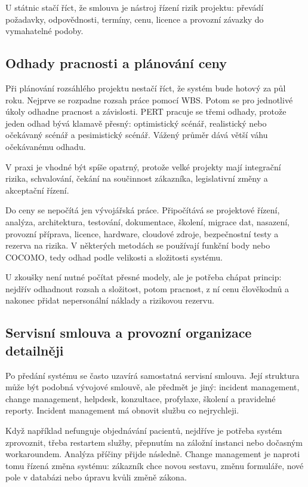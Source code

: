 U státnic stačí říct, že smlouva je nástroj řízení rizik projektu: převádí požadavky, odpovědnosti, termíny, cenu, licence a provozní závazky do vymahatelné podoby.

\subsection*{Odhady pracnosti a plánování ceny}

Při plánování rozsáhlého projektu nestačí říct, že systém bude hotový za půl roku. Nejprve se rozpadne rozsah práce pomocí WBS. Potom se pro jednotlivé úkoly odhadne pracnost a závislosti. PERT pracuje se třemi odhady, protože jeden odhad bývá klamavě přesný: optimistický scénář, realistický nebo očekávaný scénář a pesimistický scénář. Vážený průměr dává větší váhu očekávanému odhadu.

V praxi je vhodné být spíše opatrný, protože velké projekty mají integrační rizika, schvalování, čekání na součinnost zákazníka, legislativní změny a akceptační řízení.

Do ceny se nepočítá jen vývojářská práce. Připočítává se projektové řízení, analýza, architektura, testování, dokumentace, školení, migrace dat, nasazení, provozní příprava, licence, hardware, cloudové zdroje, bezpečnostní testy a rezerva na rizika. V některých metodách se používají funkční body nebo COCOMO, tedy odhad podle velikosti a složitosti systému.

U zkoušky není nutné počítat přesné modely, ale je potřeba chápat princip: nejdřív odhadnout rozsah a složitost, potom pracnost, z ní cenu člověkodnů a nakonec přidat nepersonální náklady a rizikovou rezervu.

\subsection*{Servisní smlouva a provozní organizace detailněji}

Po předání systému se často uzavírá samostatná servisní smlouva. Její struktura může být podobná vývojové smlouvě, ale předmět je jiný: incident management, change management, helpdesk, konzultace, profylaxe, školení a pravidelné reporty. Incident management má obnovit službu co nejrychleji.

Když například nefunguje objednávání pacientů, nejdříve je potřeba systém zprovoznit, třeba restartem služby, přepnutím na záložní instanci nebo dočasným workaroundem. Analýza příčiny přijde následně. Change management je naproti tomu řízená změna systému: zákazník chce novou sestavu, změnu formuláře, nové pole v databázi nebo úpravu kvůli změně zákona.

